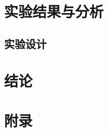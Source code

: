\documentclass[12pt]{article}
\begin{document}
\newpage

\section{实验结果与分析}
\subsection{实验设计}

\newpage
\section{结论}




\appendix
\section*{\centering \Huge 附录}
\end{document}
